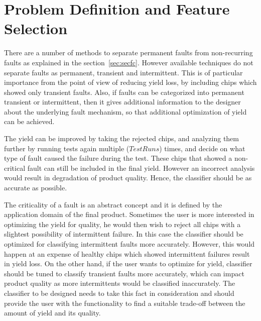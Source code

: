 \chapter{Problem Definition and Feature Selection}
\label{chap:chapter4}

There are a number of methods to separate permanent faults from non-recurring faults as explained in the section~\ref{sec:secfc}. However available techniques do not separate faults as permanent, transient and intermittent. This is of particular importance from the point of view of reducing yield loss, by including chips which showed only transient faults. Also, if faults can be categorized into permanent transient or intermittent, then it gives additional information to the designer about the underlying fault mechanism, so that additional optimization of yield can be achieved. 

The yield can be improved by taking the rejected chips, and analyzing them further by running tests again multiple ($TestRuns$) times, and decide on what type of fault caused the failure during the test. These chips that showed a non-critical fault can still be included in the final yield. However an incorrect analysis would result in degradation of product quality. Hence, the classifier should be as accurate as possible.

The criticality of a fault is an abstract concept and it is defined by the application domain of the final product. Sometimes the user is more interested in optimizing the yield for quality, he would then wish to reject all chips with a slightest possibility of intermittent failure. In this case the classifier should be optimized for classifying intermittent faults more accurately. However, this would happen at an expense of healthy chips which showed intermittent failures result in yield loss. On the other hand, if the user wants to optimize for yield, classifier should be tuned to classify transient faults more accurately, which can impact product quality as more intermittents would be classified inaccurately. The classifier to be designed needs to take this fact in consideration and should provide the user with the functionality to find a suitable trade-off between the amount of yield and its quality.

